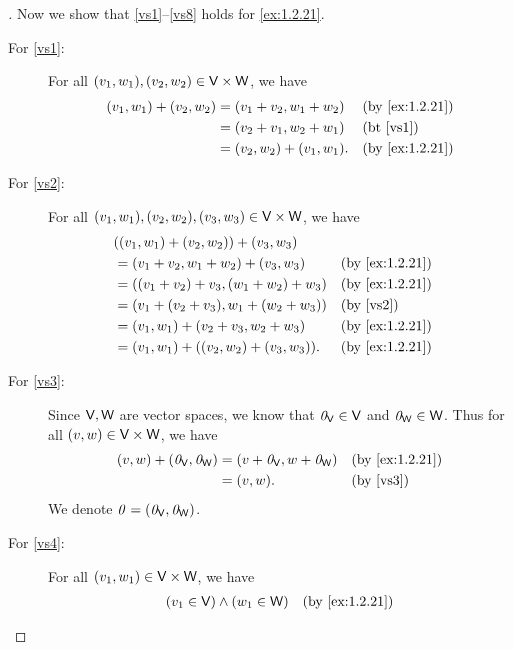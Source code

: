 \begin{proof}[]
  Now we show that \ref{vs1}--\ref{vs8} holds for \cref{ex:1.2.21}.
  \begin{description}
    \item[For \ref{vs1}:]
      For all \((v_1, w_1), (v_2, w_2) \in \mathsf{V} \times \mathsf{W}\), we have
      \begin{align*}
        (v_1, w_1) + (v_2, w_2) & = (v_1 + v_2, w_1 + w_2)   &  & \by{ex:1.2.21}        \\
                                & = (v_2 + v_1, w_2 + w_1)   &  & \text{(bt \ref{vs1})} \\
                                & = (v_2, w_2) + (v_1, w_1). &  & \by{ex:1.2.21}
      \end{align*}
    \item[For \ref{vs2}:]
      For all \((v_1, w_1), (v_2, w_2), (v_3, w_3) \in \mathsf{V} \times \mathsf{W}\), we have
      \begin{align*}
         & ((v_1, w_1) + (v_2, w_2)) + (v_3, w_3)                               \\
         & = (v_1 + v_2, w_1 + w_2) + (v_3, w_3)     &  & \by{ex:1.2.21}        \\
         & = ((v_1 + v_2) + v_3, (w_1 + w_2) + w_3)  &  & \by{ex:1.2.21}        \\
         & = (v_1 + (v_2 + v_3), w_1 + (w_2 + w_3))  &  & \text{(by \ref{vs2})} \\
         & = (v_1, w_1) + (v_2 + v_3, w_2 + w_3)     &  & \by{ex:1.2.21}        \\
         & = (v_1, w_1) + ((v_2, w_2) + (v_3, w_3)). &  & \by{ex:1.2.21}
      \end{align*}
    \item[For \ref{vs3}:]
      Since \(\mathsf{V}, \mathsf{W}\) are vector spaces, we know that \(\mathit{0}_{\mathsf{V}} \in \mathsf{V}\) and \(\mathit{0}_{\mathsf{W}} \in \mathsf{W}\).
      Thus for all \((v, w) \in \mathsf{V} \times \mathsf{W}\), we have
      \begin{align*}
        (v, w) + (\zv_{\V}, \zv_{\W}) & = (v + \zv_{\V}, w + \zv_{\W}) &  & \by{ex:1.2.21}        \\
                                      & = (v, w).                      &  & \text{(by \ref{vs3})}
      \end{align*}
      We denote \(\mathit{0} = (\mathit{0}_{\mathsf{V}}, \mathit{0}_{\mathsf{W}})\).
    \item[For \ref{vs4}:]
      For all \((v_1, w_1) \in \mathsf{V} \times \mathsf{W}\), we have
      \begin{align*}
                 & (v_1 \in \V) \land (w_1 \in \W)                                      &  & \by{ex:1.2.21}                \\

\end{align*}
\end{description}
\end{proof}
